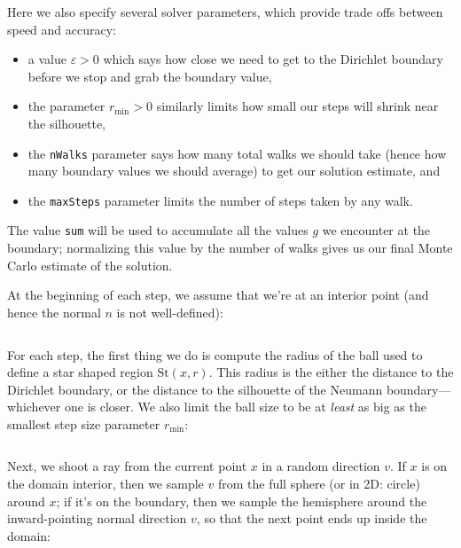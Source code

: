 \documentclass{article}
\newcommand{\code}[1]{\texttt{\small{#1}}}
\newcommand{\St}{\text{St}}
\renewcommand{\vec}[1]{#1}
\begin{document}
\inputminted[fontsize=\small,linenos,firstline=119,lastline=126,bgcolor=bg]{cpp}{../code/WoStLaplace2D.cpp}

Here we also specify several solver parameters, which provide trade offs between speed and accuracy:
\begin{itemize}
   \item a value \(\varepsilon > 0\) which says how close we need to get to the Dirichlet boundary before we stop and grab the boundary value,
   \item the parameter \(r_{\min} > 0\) similarly limits how small our steps will shrink near the silhouette,
   \item the \code{nWalks} parameter says how many total walks we should take (hence how many boundary values we should average) to get our solution estimate, and
   \item the \code{maxSteps} parameter limits the number of steps taken by any walk.
\end{itemize}
The value \code{sum} will be used to accumulate all the values \(g\) we encounter at the boundary; normalizing this value by the number of walks gives us our final Monte Carlo estimate of the solution.  

At the beginning of each step, we assume that we're at an interior point (and hence the normal \(n\) is not well-defined):

\inputminted[fontsize=\small,linenos,firstline=128,lastline=132,bgcolor=bg]{cpp}{../code/WoStLaplace2D.cpp}

For each step, the first thing we do is compute the radius of the ball used to define a star shaped region \(\St(\vec{x},r)\).  This radius is the either the distance to the Dirichlet boundary, or the distance to the silhouette of the Neumann boundary---whichever one is closer.  We also limit the ball size to be at \emph{least} as big as the smallest step size parameter \(r_{\min}\):

\inputminted[fontsize=\small,linenos,firstline=134,lastline=141,bgcolor=bg]{cpp}{../code/WoStLaplace2D.cpp}

Next, we shoot a ray from the current point \(x\) in a random direction \(v\).  If \(x\) is on the domain interior, then we sample \(v\) from the full sphere (or in 2D: circle) around \(x\); if it's on the boundary, then we sample the hemisphere around the inward-pointing normal direction \(v\), so that the next point ends up inside the domain:

\inputminted[fontsize=\small,linenos,firstline=143,lastline=149,bgcolor=bg]{cpp}{../code/WoStLaplace2D.cpp}
\end{document}
